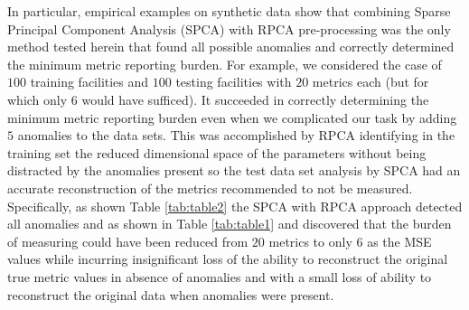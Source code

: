 \documentclass[conference]{IEEEtran}
\begin{document}
In particular, empirical examples on synthetic data show that combining Sparse Principal Component Analysis (SPCA) with RPCA pre-processing was the only method tested herein that found all possible anomalies 
and correctly determined the minimum metric reporting burden. For example, we considered the case of $100$ training facilities and $100$ testing facilities with $20$ metrics each (but for which only $6$ would have sufficed). It succeeded in correctly determining the minimum metric reporting burden even when we  complicated our task by adding $5$ anomalies to the  data sets.  This was accomplished by RPCA identifying in the training set the reduced dimensional space of the parameters without being distracted by the anomalies present so the test data set analysis by SPCA had an accurate reconstruction of the metrics recommended to not be measured.
Specifically, as shown Table \ref{tab:table2} the SPCA with RPCA approach detected all anomalies  and as shown in Table \ref{tab:table1} and discovered that the burden of measuring could have been reduced from $20$ metrics to only $6$ as the MSE values while incurring insignificant loss of the ability to reconstruct the original true metric values in absence of anomalies and with a small loss of ability to reconstruct the original data when anomalies were present.
\end{document}
